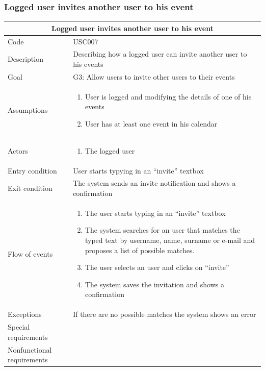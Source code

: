 \documentclass[10pt,a4paper,titlepage]{article}
\begin{document}
\clearpage
\subsubsection{Logged user invites another user to his event}

\begin{tabular}[h]{| p{3cm} | p{10cm} |}
\hline \multicolumn{2}{|c|}{\textbf{ Logged user invites another user to his event }} \\ 
\hline Code & USC007 \\ 
\hline Description & Describing how a logged user can invite another user to his events \\
\hline Goal & G3: Allow users to invite other users to their events \\
\hline Assumptions  & \begin{enumerate}
\item User is logged and modifying the details of one of his events
\item User has at least one event in his calendar
\end{enumerate} \\
\hline Actors &  \begin{enumerate}
\item The logged user
\end{enumerate} \\
\hline Entry condition & User starts typying in an “invite” textbox \\
\hline Exit condition & The system sends an invite notification  and shows a confirmation\\
\hline Flow of events & \begin{enumerate}
\item The user starts typing in an “invite” textbox
\item The system searches for an user that matches the typed text by username, name, surname or e-mail and proposes a list of possible matches.
\item The user selects an user and clicks on “invite”
\item The system saves the invitation and shows a confirmation
\end{enumerate}\\
\hline Exceptions & If there are no possible matches the system shows an error \\
\hline Special requirements & \\
\hline Nonfunctional requirements & \\
\hline
\end{tabular}
\end{document}
